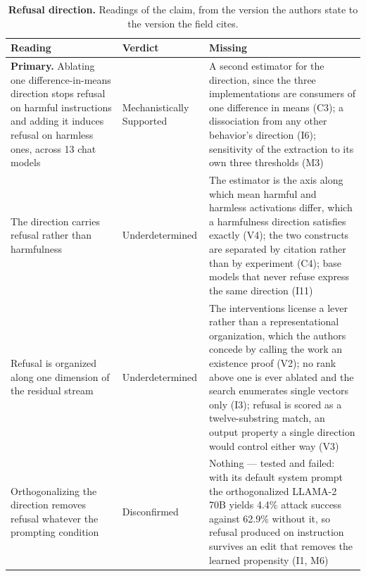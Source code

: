 \clearpage
\begin{table}[H]
\centering
\footnotesize
\caption{\textbf{Refusal direction.} Readings of the claim, from the version the authors state to the version the
field cites.}
\label{tab:refusal-readings}
\renewcommand{\arraystretch}{1.18}
\begin{tabular}{@{}>{\raggedright\arraybackslash}p{3.3cm}l>{\raggedright\arraybackslash}p{4.4cm}@{}}
\toprule
\textbf{Reading} & \textbf{Verdict} & \textbf{Missing} \\
\midrule
\textbf{Primary.} Ablating one difference-in-means direction stops refusal on harmful instructions and adding it induces refusal on harmless ones, across 13 chat models
  & Mechanistically Supported
  & A second estimator for the direction, since the three implementations are consumers of one difference in means (C3); a dissociation from any other behavior's direction (I6); sensitivity of the extraction to its own three thresholds (M3) \\
\addlinespace[2pt]
The direction carries refusal rather than harmfulness
  & Underdetermined
  & The estimator is the axis along which mean harmful and harmless activations differ, which a harmfulness direction satisfies exactly (V4); the two constructs are separated by citation rather than by experiment (C4); base models that never refuse express the same direction (I11) \\
\addlinespace[2pt]
Refusal is organized along one dimension of the residual stream
  & Underdetermined
  & The interventions license a lever rather than a representational organization, which the authors concede by calling the work an existence proof (V2); no rank above one is ever ablated and the search enumerates single vectors only (I3); refusal is scored as a twelve-substring match, an output property a single direction would control either way (V3) \\
\addlinespace[2pt]
Orthogonalizing the direction removes refusal whatever the prompting condition
  & Disconfirmed
  & Nothing --- tested and failed: with its default system prompt the orthogonalized LLAMA-2 70B yields 4.4\% attack success against 62.9\% without it, so refusal produced on instruction survives an edit that removes the learned propensity (I1, M6) \\
\bottomrule
\end{tabular}
\end{table}

